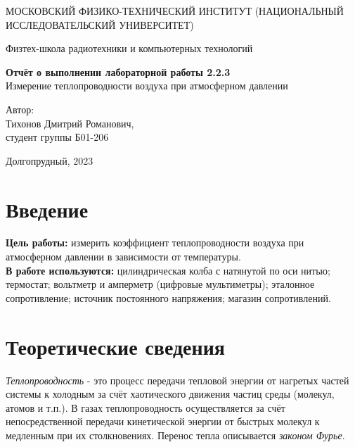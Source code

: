 \documentclass[a4paper, 12pt]{article}
\begin{document}
    \begin{titlepage}
	\begin{center}
            {\large МОСКОВСКИЙ ФИЗИКО-ТЕХНИЧЕСКИЙ ИНСТИТУТ (НАЦИОНАЛЬНЫЙ       ИССЛЕДОВАТЕЛЬСКИЙ УНИВЕРСИТЕТ)}
	\end{center}
 
	\begin{center}
		{\large Физтех-школа радиотехники и компьютерных технологий}
	\end{center}
	
	\vspace{8cm}
	{\LARGE
		\begin{center}
                {\bf Отчёт о выполнении лабораторной работы 2.2.3}\\
                Измерение теплопроводности воздуха при атмосферном давлении
		\end{center}
	}
	\vspace{5cm}
	\begin{flushright}
		{\Large Автор:\\ Тихонов Дмитрий Романович, \\
			\vspace{0.2cm}
			студент группы Б01-206}
	\end{flushright}
	\vspace{5cm}
	\begin{center}
		\Large Долгопрудный, 2023
	\end{center}
    \end{titlepage}

    \section*{Введение}
        \noindent \textbf{Цель работы:} измерить коэффициент теплопроводности воздуха при атмосферном давлении в зависимости от температуры.\\
        
        \noindent \textbf{В работе используются:} цилиндрическая колба с натянутой по оси нитью; термостат; вольтметр и амперметр (цифровые мультиметры); эталонное сопротивление; источник постоянного напряжения; магазин сопротивлений.

    \section*{Теоретические сведения}
        \noindent \textit{Теплопроводность} - это процесс передачи тепловой энергии от нагретых частей системы к холодным за счёт хаотического движения частиц среды (молекул, атомов и т.п.). В газах теплопроводность осуществляется за счёт непосредственной передачи кинетической энергии от быстрых молекул к медленным при их столкновениях. Перенос тепла описывается \textit{законом Фурье}.
    
\end{document}
